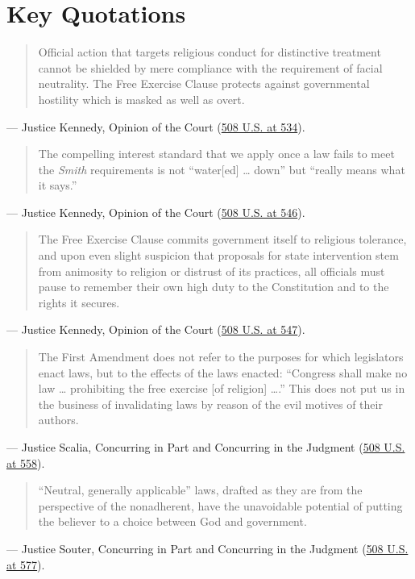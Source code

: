 \documentclass[12pt]{article}
\begin{document}
\section{Key Quotations}

\begin{quote}
Official action that targets religious conduct for distinctive treatment cannot be shielded by mere compliance with the requirement of facial neutrality. The Free Exercise Clause protects against governmental hostility which is masked as well as overt.
\end{quote}
\noindent --- Justice Kennedy, Opinion of the Court (\href{https://supreme.justia.com/cases/federal/us/508/520/}{508 U.S. at 534}).

\begin{quote}
The compelling interest standard that we apply once a law fails to meet the \textit{Smith} requirements is not ``water[ed] \dots{} down'' but ``really means what it says.''
\end{quote}
\noindent --- Justice Kennedy, Opinion of the Court (\href{https://www.law.cornell.edu/supct/html/91-948.ZO.html}{508 U.S. at 546}).

\begin{quote}
The Free Exercise Clause commits government itself to religious tolerance, and upon even slight suspicion that proposals for state intervention stem from animosity to religion or distrust of its practices, all officials must pause to remember their own high duty to the Constitution and to the rights it secures.
\end{quote}
\noindent --- Justice Kennedy, Opinion of the Court (\href{https://www.law.cornell.edu/supct/html/91-948.ZO.html}{508 U.S. at 547}).

\begin{quote}
The First Amendment does not refer to the purposes for which legislators enact laws, but to the effects of the laws enacted: ``Congress shall make no law \dots{} prohibiting the free exercise [of religion] \dots{}.'' This does not put us in the business of invalidating laws by reason of the evil motives of their authors.
\end{quote}
\noindent --- Justice Scalia, Concurring in Part and Concurring in the Judgment (\href{https://supreme.justia.com/cases/federal/us/508/520/}{508 U.S. at 558}).

\begin{quote}
``Neutral, generally applicable'' laws, drafted as they are from the perspective of the nonadherent, have the unavoidable potential of putting the believer to a choice between God and government.
\end{quote}
\noindent --- Justice Souter, Concurring in Part and Concurring in the Judgment (\href{https://supreme.justia.com/cases/federal/us/508/520/}{508 U.S. at 577}).
\end{document}
